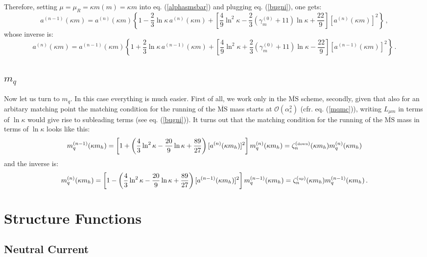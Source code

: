 \documentclass[10pt,a4paper]{article}
\begin{document}
Therefore, setting $\mu=\mu_R=\kappa m(m) = \kappa m$ into eq. (\ref{alphasmsbar}) and plugging eq. (\ref{bugni}), one gets:
\begin{equation}
a^{(n-1)}(\kappa m)=a^{(n)}(\kappa m)\left\{1-\frac23 \ln\kappa\,a^{(n)}(\kappa m)+\left[\frac49\ln^2\kappa-\frac{2}3\left(\gamma_m^{(0)}+11\right)\ln\kappa+\frac{22}9\right][a^{(n)}(\kappa m)]^2\right\}\,,
\end{equation}
whose inverse is:
\begin{equation}
a^{(n)}(\kappa m)=a^{(n-1)}(\kappa m)\left\{1+\frac23 \ln\kappa\,a^{(n-1)}(\kappa m)+\left[\frac49\ln^2\kappa+\frac{2}3\left(\gamma_m^{(0)}+11\right)\ln\kappa-\frac{22}9\right][a^{(n-1)}(\kappa m)]^2\right\}\,.
\end{equation}


\subsection{$m_q$}

Now let us turn to $m_q$. In this case everything is much easier. First of all, we work only in the $\overline{\mbox{MS}}$ scheme, secondly, given that also for an arbitary matching point the matching condition for the running of the $\overline{\mbox{MS}}$ mass starts at $\mathcal{O}(\alpha_s^2)$ (cfr. eq. (\ref{mqmc})), writing $L_{\mu m}$ in terms of $\ln\kappa$ would give rise to subleading terms (see eq. (\ref{bugni})). It turns out that the matching condition for the running of the $\overline{\mbox{MS}}$ mass in terms of $\ln\kappa$ looks like this:
\begin{equation}
m_q^{(n-1)}(\kappa m_h)=\left[1+\left(\frac43\ln^2\kappa-\frac{20}9\ln\kappa+\frac{89}{27}\right)[a^{(n)}(\kappa m_h)]^2\right]m_q^{(n)}(\kappa m_h)=\zeta_n^{(\mbox{\tiny down})}(\kappa m_h)m_q^{(n)}(\kappa m_h)
\end{equation}
and the inverse is:
\begin{equation}
m_q^{(n)}(\kappa m_h)=\left[1-\left(\frac43\ln^2\kappa-\frac{20}9\ln\kappa+\frac{89}{27}\right)[a^{(n-1)}(\kappa m_h)]^2\right]m_q^{(n-1)}(\kappa m_h)=\zeta_n^{(\mbox{\tiny up})}(\kappa m_h)m_q^{(n-1)}(\kappa m_h)\,.
\end{equation}

\section{Structure Functions}

\subsection{Neutral Current}
\end{document}
